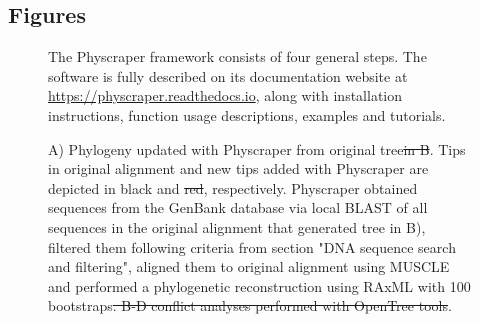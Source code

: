 \documentclass{bmcart}
\providecommand{\DIFaddtex}[1]{{\protect\color{blue}\uwave{#1}}} %
\providecommand{\DIFdeltex}[1]{{\protect\color{red}\sout{#1}}}                      %
\providecommand{\DIFaddFL}[1]{\DIFadd{#1}} %
\providecommand{\DIFdelFL}[1]{\DIFdel{#1}} %
\providecommand{\DIFaddbeginFL}{} %
\providecommand{\DIFaddendFL}{} %
\providecommand{\DIFdelbeginFL}{} %
\providecommand{\DIFdelendFL}{} %
\providecommand{\DIFadd}[1]{\texorpdfstring{\DIFaddtex{#1}}{#1}} %
\providecommand{\DIFdel}[1]{\texorpdfstring{\DIFdeltex{#1}}{}} %
\begin{document}
\begin{backmatter}
\section*{Figures}
  \begin{figure}[h!]
  \caption{The Physcraper framework consists of four general steps. The software is fully
  described on its documentation website at \href{https://physcraper.readthedocs.io}{https://physcraper.readthedocs.io},
  along with installation instructions, function usage descriptions, examples and tutorials.
}
\end{figure}

\begin{figure}[h!]
  \caption{A) Phylogeny updated with Physcraper from original
  \cite{gottlieb2005molecular} tree\DIFdelbeginFL \DIFdelFL{in B}\DIFdelendFL .
  Tips in original alignment and new tips added with Physcraper are depicted in
  black and \DIFdelbeginFL \DIFdelFL{red}\DIFdelendFL \DIFaddbeginFL \DIFaddFL{golden}\DIFaddendFL , respectively. Physcraper obtained sequences from the GenBank
  database via local BLAST of all sequences in the original alignment that generated
  tree in B), filtered them following criteria from section "DNA sequence search and
  filtering", aligned them to original alignment using MUSCLE and performed a
  phylogenetic reconstruction using RAxML with 100 bootstraps\DIFdelbeginFL \DIFdelFL{. B-D conflict analyses
  performed with OpenTree tools}\DIFdelendFL .}
\end{figure}


\end{backmatter}
\end{document}
